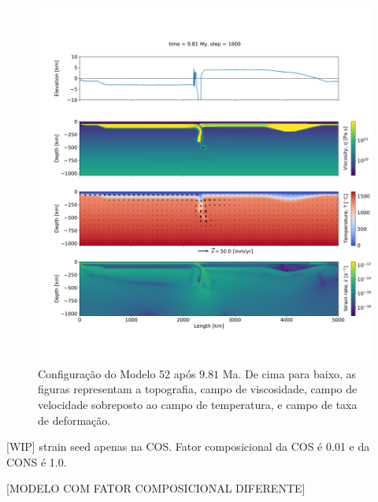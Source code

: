 \begin{figure}
    \centering
    \includegraphics[trim={1.5cm 3.5cm 0.0cm 4cm}, clip, width=1.0 \textwidth]{fig/strak_52-11.png}
    \caption{Configuração do Modelo 52 após $9.81$ Ma. De cima para baixo, as figuras representam a topografia, campo de viscosidade, campo de velocidade sobreposto ao campo de temperatura, e campo de taxa de deformação.}
    \label{fig:stra_52-11}
\end{figure}

[WIP] strain seed apenas na COS. Fator composicional da COS é 0.01 e da CONS é 1.0.

[MODELO COM FATOR COMPOSICIONAL DIFERENTE]


